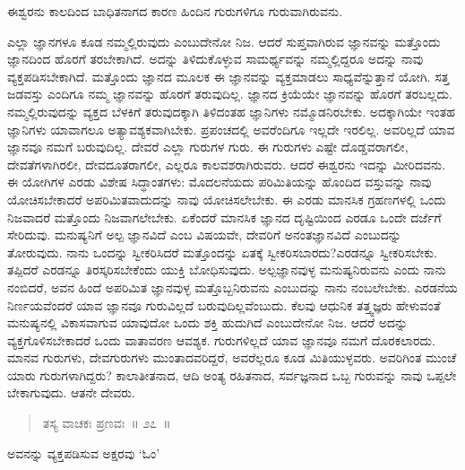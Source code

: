 \vspace{-0.4cm}

ಈಶ್ವರನು ಕಾಲದಿಂದ ಬಾಧಿತನಾಗದ ಕಾರಣ ಹಿಂದಿನ ಗುರುಗಳಿಗೂ ಗುರುವಾಗಿರು\break ವನು. 

ಎಲ್ಲಾ ಜ್ಞಾನಗಳೂ ಕೂಡ ನಮ್ಮಲ್ಲಿರುವುದು ಎಂಬುದೇನೋ ನಿಜ. ಆದರೆ ಸುಪ್ತವಾಗಿರುವ ಜ್ಞಾನವನ್ನು ಮತ್ತೊಂದು ಜ್ಞಾನದಿಂದ ಹೊರಗೆ ತರಬೇಕಾಗಿದೆ. ಅದನ್ನು ತಿಳಿದುಕೊಳ್ಳುವ ಸಾಮರ್ಥ್ಯವನ್ನು ನಮ್ಮಲ್ಲಿದ್ದರೂ ಅದನ್ನು ನಾವು ವ್ಯಕ್ತಪಡಿಸಬೇಕಾಗಿದೆ. ಮತ್ತೊಂದು ಜ್ಞಾನದ ಮೂಲಕ ಈ ಜ್ಞಾನವನ್ನು ವ್ಯಕ್ತಮಾಡಲು ಸಾಧ್ಯವೆನ್ನುತ್ತಾನೆ ಯೋಗಿ. ಸತ್ತ ಜಡವಸ್ತು ಎಂದಿಗೂ ನಮ್ಮ ಜ್ಞಾನವನ್ನು ಹೊರಗೆ ತರುವುದಿಲ್ಲ. ಜ್ಞಾನದ ಕ್ರಿಯೆಯೇ ಜ್ಞಾನವನ್ನು ಹೊರಗೆ ತರಬಲ್ಲದು. ನಮ್ಮಲ್ಲಿರುವುದನ್ನು ವ್ಯಕ್ತದ ಬೆಳಕಿಗೆ ತರುವುದಕ್ಕಾಗಿ ತಿಳಿದಂತಹ ಜ್ಞಾನಿಗಳು ನಮ್ಮೊಡನಿರಬೇಕು. ಅದಕ್ಕಾಗಿಯೇ ಇಂತಹ ಜ್ಞಾನಿಗಳು ಯಾವಾಗಲೂ ಅತ್ಯಾವಶ್ಯಕವಾಗಿಬೇಕು. ಪ್ರಪಂಚದಲ್ಲಿ ಅವರೆಂದಿಗೂ ಇಲ್ಲದೇ ಇರಲಿಲ್ಲ. ಅವರಿಲ್ಲದೆ ಯಾವ ಜ್ಞಾನವೂ ನಮಗೆ ಬರುವುದಿಲ್ಲ. ದೇವರೆ ಎಲ್ಲಾ ಗುರುಗಳ ಗುರು. ಈ ಗುರುಗಳು ಎಷ್ಟೇ ದೊಡ್ಡವರಾಗಲೀ, ದೇವತೆಗಳಾಗಿರಲೀ, ದೇವದೂತರಾಗಲೀ, ಎಲ್ಲರೂ ಕಾಲವಶರಾಗಿರುವರು. ಆದರೆ ಈಶ್ವರನು ಇದನ್ನು ಮೀರಿದವನು. ಈ ಯೋಗಿಗಳ ಎರಡು ವಿಶೇಷ ಸಿದ್ಧಾಂತಗಳು: ಮೊದಲನೆಯದು ಪರಿಮಿತಿಯನ್ನು ಹೊಂದಿದ ವಸ್ತುವನ್ನು ನಾವು ಯೋಚಿಸಬೇಕಾದರೆ ಅಪರಿಮಿತವಾದುದನ್ನು ನಾವು ಯೋಚಿಸಲೇಬೇಕು. ಈ ಎರಡು ಮಾನಸಿಕ ಗ್ರಹಣಗಳಲ್ಲಿ ಒಂದು ನಿಜವಾದರೆ ಮತ್ತೊಂದು ನಿಜವಾಗಲೇಬೇಕು. ಏಕೆಂದರೆ ಮಾನಸಿಕ ಜ್ಞಾನದ ದೃಷ್ಟಿಯಿಂದ ಎರಡೂ ಒಂದೇ ದರ್ಜೆಗೆ ಸೇರಿದುವು. ಮನುಷ್ಯನಿಗೆ ಅಲ್ಪ ಜ್ಞಾನವಿದೆ ಎಂಬ ವಿಷಯವೇ, ದೇವರಿಗೆ ಅನಂತಜ್ಞಾನವಿದೆ ಎಂಬುದನ್ನು ತೋರುವುದು. ನಾನು ಒಂದನ್ನು ಸ್ವೀಕರಿಸಿದರೆ ಮತ್ತೊಂದನ್ನು ಏತಕ್ಕೆ ಸ್ವೀಕರಿಸಬಾರದು?\break ಎರಡನ್ನೂ ಸ್ವೀಕರಿಸಬೇಕು. ತಪ್ಪಿದರೆ ಎರಡನ್ನೂ ತಿರಸ್ಕರಿಸಬೇಕೆಂದು ಯುಕ್ತಿ ಬೋಧಿಸುವುದು. ಅಲ್ಪಜ್ಞಾನವುಳ್ಳ ಮನುಷ್ಯನಿರುವನು ಎಂದು ನಾನು ನಂಬಿದರೆ, ಅವನ ಹಿಂದೆ ಅಪರಿಮಿತ ಜ್ಞಾನವುಳ್ಳ ಮತ್ತೊಬ್ಬನಿರುವನು ಎಂಬುದನ್ನು ನಾನು ನಂಬಲೇಬೇಕು. ಎರಡನೆಯ ನಿರ್ಣಯವೆಂದರೆ ಯಾವ ಜ್ಞಾನವೂ ಗುರುವಿಲ್ಲದೆ ಬರುವುದಿಲ್ಲವೆಂಬುದು. ಕೆಲವು ಆಧುನಿಕ ತತ್ತ್ವಜ್ಞರು ಹೇಳುವಂತೆ ಮನುಷ್ಯನಲ್ಲಿ ವಿಕಾಸವಾಗುವ ಯಾವುದೋ ಒಂದು ಶಕ್ತಿ ಹುದುಗಿದೆ ಎಂಬುದೇನೋ ನಿಜ. ಆದರೆ ಅದನ್ನು ವ್ಯಕ್ತಗೊಳಿಸಬೇಕಾದರೆ ಒಂದು ವಾತಾವರಣ ಆವಶ್ಯಕ. ಗುರುಗಳಿಲ್ಲದೆ ಯಾವ ಜ್ಞಾನವೂ ನಮಗೆ ದೊರಕಲಾರದು. ಮಾನವ ಗುರುಗಳು, ದೇವಗುರುಗಳು ಮುಂತಾದವರಿದ್ದರೆ, ಅವರೆಲ್ಲರೂ ಕೂಡ ಮಿತಿಯುಳ್ಳವರು. ಅವರಿಗಿಂತ ಮುಂಚೆ ಯಾರು ಗುರುಗಳಾಗಿದ್ದರು? ಕಾಲಾತೀತನಾದ, ಆದಿ ಅಂತ್ಯ ರಹಿತನಾದ, ಸರ್ವಜ್ಞನಾದ ಒಬ್ಬ ಗುರುವನ್ನು ನಾವು ಒಪ್ಪಲೇ ಬೇಕಾಗುವುದು. ಆತನೇ ದೇವರು. 

\vspace{-0.35cm}

\begin{verse}
ತಸ್ಯ ವಾಚಕಃ ಪ್ರಣವಃ~॥ ೨೭~॥
\end{verse}

\vspace{-0.35cm}

ಅವನನ್ನು ವ್ಯಕ್ತಪಡಿಸುವ ಅಕ್ಷರವು ‘ಓಂ’

